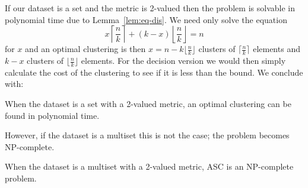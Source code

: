 If our dataset is a set and the metric is 2-valued then the problem is
solvable in polynomial time due to Lemma~\ref{lem:eq-dis}.  We need only solve
the equation
\begin{equation*}
  x \left\lceil\frac{n}{k}\right\rceil
  + (k-x) \left\lfloor\frac{n}{k}\right\rfloor = n
\end{equation*}
for $x$ and an optimal clustering is then $x = n-k\lfloor\frac{n}{k}\rfloor$
clusters of $\lceil\frac{n}{k}\rceil$ elements and $k-x$ clusters of
$\lfloor\frac{n}{k}\rfloor$ elements.  For the decision version we would then
simply calculate the cost of the clustering to see if it is less than the
bound.  We conclude with:
\begin{thm}
  When the dataset is a set with a 2-valued metric, an optimal clustering can
  be found in polynomial time.
\end{thm}

However, if the dataset is a multiset this is not the case; the problem
becomes NP-complete.
\begin{thm}
  When the dataset is a multiset with a 2-valued metric, ASC is an NP-complete
  problem.
\end{thm}

